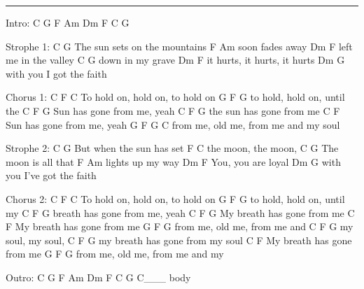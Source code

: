 \noindent\rule{\columnwidth}{1pt}

\begin{multicols}{2}
\begin{lstsong}
Intro: C G F Am Dm F C G

Strophe 1:
    C               G
The sun sets on the mountains
F            Am
soon fades away
Dm             F
left me in the valley
C         G
down in my grave
   Dm                  F
it hurts, it hurts, it hurts
     Dm            G
with you I got the faith

Chorus 1:
    C          F         C
To hold on, hold on, to hold on
   G          F     G
to hold, hold on, until the
C                 F   G
Sun has gone from me, yeah
    C                 F   G
the sun has gone from me
C                 F
Sun has gone from me, yeah
     G       F        G         C
from me, old me, from me and my soul











Strophe 2:
    C                G
But when the sun has set
    F         C
the moon, the moon,
    C       G
The moon is all that
F            Am
lights up my way
Dm           F
You, you are loyal
     Dm               G 
with you I've got the faith

Chorus 2:
    C          F         C
To hold on, hold on, to hold on
   G          F     G
to hold, hold on, until my
C                    F     G
breath has gone from me, yeah
   C                    F   G
My breath has gone from me
   C                    F
My breath has gone from me
     G       F        G
from me, old me, from me and
   C        F    G
my soul, my soul,
   C                       F    G
my breath has gone from my soul
   C                    F
My breath has gone from me
     G       F        G
from me, old me, from me and my

Outro:
C    G F Am Dm F C G  C___
body
\end{lstsong}
\end{multicols}
\newpage

